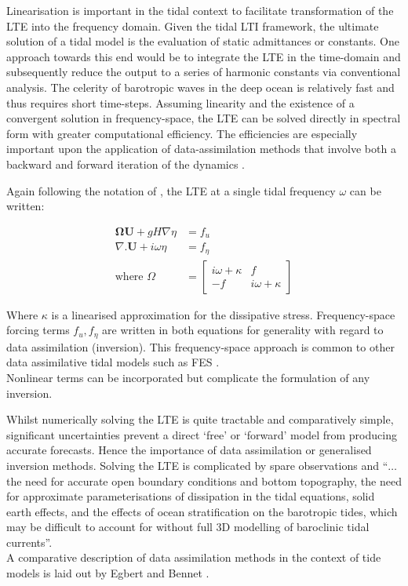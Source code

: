 Linearisation is important in the tidal context to facilitate transformation of the LTE into the frequency domain.   Given the tidal LTI framework, the ultimate solution of a tidal model is the evaluation of static admittances or constants.   One approach towards this end would be to integrate the LTE in the time-domain and subsequently reduce the output to a series of harmonic constants via conventional analysis.   The celerity of barotropic waves in the deep ocean is relatively fast and thus requires short time-steps.   Assuming linearity and the existence of a convergent solution in frequency-space, the LTE can be solved directly in spectral form with greater computational efficiency.   The efficiencies are especially important upon the application of data-assimilation methods that involve both a backward and forward iteration of the dynamics \cite[pp184]{Egbert:2002ug}.


Again following the notation of \cite[pp186]{Egbert:2002ug}, the LTE at a single tidal frequency $\omega$ can be written:

\begin{align}
\label{E:LTE_momtm_w}
\mathbf{\Omega} \mathbf{U} + gH\nabla \eta &= f_u \\
\label{E:LTE_cont_w}
\nabla.\mathbf{U} + i\omega\eta &= f_\eta\\
\mbox{where   } \Omega             &=
\left[ \begin{array}{cc} 
      i\omega + \kappa & f \\ 
       -f              & i\omega + \kappa  
                        \end{array} \right]   \nonumber
\end{align}

Where $\kappa$ is a linearised approximation for the dissipative stress.   Frequency-space forcing terms $f_u, f_\eta$ are written in both equations for generality with regard to data assimilation (inversion).  This frequency-space approach is common to other data assimilative tidal models such as FES \cite[pp395]{Lyard:2006ir}.\\
Nonlinear terms can be incorporated but complicate the formulation of any inversion.



Whilst numerically solving the LTE is quite tractable and comparatively simple, significant uncertainties prevent a direct `free' or `forward' model from producing accurate forecasts.  Hence the importance of data assimilation or generalised inversion methods.  Solving the LTE is complicated by spare observations and ``$\dots$ the need for accurate open boundary conditions and bottom topography, the need for approximate parameterisations of dissipation in the tidal equations, solid earth effects, and the effects of ocean stratification on the barotropic tides, which may be difficult to account for without full 3D modelling of baroclinic tidal currents''\citep[183]{Egbert:2002ug}.\\
A comparative description of data assimilation methods in the context of tide models is laid out by Egbert and Bennet \cite{Egbert:1996vr}.\\   



